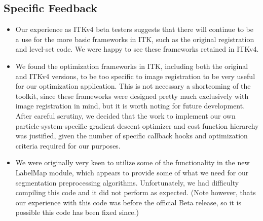\documentclass[11pt]{article}
\begin{document}
\subsection{Specific Feedback}
\begin{itemize}

\item Our experience as ITKv4 beta testers suggests that there will
  continue to be a use for the more basic frameworks in ITK, such as
  the original registration and level-set code.  We were happy to see
  these frameworks retained in ITKv4.

\item We found the optimization frameworks in ITK, including
  both the original and ITKv4 versions, to be too specific to image
  registration to be very useful for our optimization application.
  This is not necessary a shortcoming of the toolkit, since these
  frameworks were designed pretty much exclusively with image
  registration in mind, but it is worth noting for future development.
  After careful scrutiny, we decided that the work to implement our
  own particle-system-specific gradient descent optimizer and cost
  function hierarchy was justified, given the number of specific
  callback hooks and optimization criteria required for our purposes.

\item We were originally very keen to utilize some
  of the functionality in the new LabelMap module, which appears to provide
  some of what we need for our segmentation preprocessing
  algorithms. Unfortunately, we had difficulty compiling this code and
  it did not perform as expected. (Note however, thats our experience
  with this code was before the official Beta release, so it is
  possible this code has been fixed since.)

\end{itemize}
\end{document}
